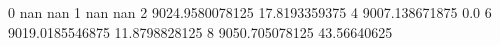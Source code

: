 0 nan nan
1 nan nan
2 9024.9580078125 17.8193359375
4 9007.138671875 0.0
6 9019.0185546875 11.8798828125
8 9050.705078125 43.56640625
